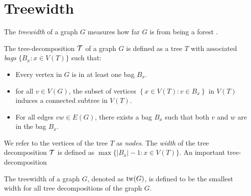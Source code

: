 \section{Treewidth}\label{sec:treewidth}

The \textit{treewidth} of a graph $G$ measures how far $G$ is from being a forest \cite{diestelGraphMinors2017}. 

\begin{definition}\label{def:tree-decomposition}
	The tree-decomposition $\mathcal{T}$ of a graph $G$ is defined as a tree $T$ with associated \textit{bags} $\lbrace B_x : x \in V(T) \rbrace$ such that:
	\begin{itemize}
		\item Every vertex in $G$ is in at least one bag $B_x$. 
		\item for all $v \in V(G)$, the subset of vertices $\left\lbrace x \in V(T): v \in B_x \right\rbrace$ in $V(T)$ induces a connected subtree in $V(T)$.
		\item For all edges $vw \in E(G)$, there exists a bag $B_x$ such that both $v$ and $w$ are in the bag $B_x$.
	\end{itemize}
\end{definition}
We refer to the vertices of the tree $T$ as \textit{nodes}. 
The \textit{width} of the tree decomposition $\mathcal{T}$ is defined as $\max \lbrace |B_x| - 1 : x \in V(T) \rbrace$. An important tree-decomposition 

\begin{definition}\label{def:treewidth}
	The treewidth of a graph $G$, denoted as $\text{tw}(G)$, is defined to be the smallest width for all tree decompositions of the graph $G$.
\end{definition}


